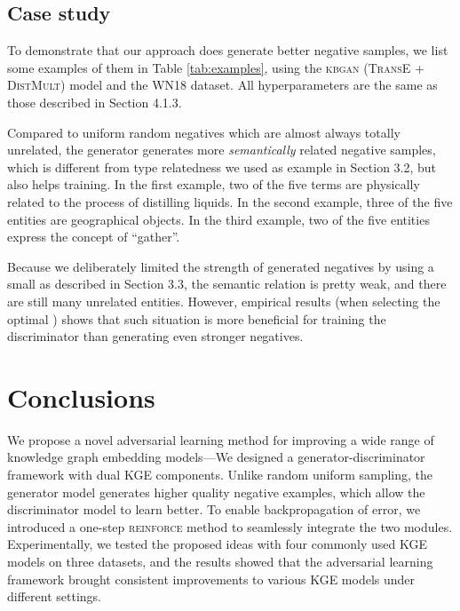 \documentclass[11pt,a4paper]{article}
\begin{document}
\subsection{Case study}

To demonstrate that our approach does generate better negative samples, we list some examples of them in Table \ref{tab:examples}, using the \textsc{kbgan} (\textsc{TransE} + \textsc{DistMult}) model and the WN18 dataset. All hyperparameters are the same as those described in Section 4.1.3.

Compared to uniform random negatives which are almost always totally unrelated, the generator generates more \emph{semantically} related negative samples, which is different from type relatedness we used as example in Section 3.2, but also helps training. In the first example, two of the five terms are physically related to the process of distilling liquids. In the second example, three of the five entities are geographical objects. In the third example, two of the five entities express the concept of ``gather''.

Because we deliberately limited the strength of generated negatives by using a small  as described in Section 3.3, the semantic relation is pretty weak, and there are still many unrelated entities. However, empirical results (when selecting the optimal ) shows that such situation is more beneficial for training the discriminator than generating even stronger negatives.

\section{Conclusions}
We propose a novel adversarial learning method for improving a wide range of knowledge graph embedding models---We designed a generator-discriminator framework with dual KGE components. Unlike random uniform sampling, the generator model generates higher quality negative examples, which allow the discriminator model to learn better. To enable backpropagation of error, we introduced a one-step \textsc{reinforce} method to seamlessly integrate the two modules. Experimentally, we tested the proposed ideas with four commonly used KGE models on three datasets, and the results showed that the adversarial learning framework brought consistent improvements to various KGE models under different settings.

\newpage


\end{document}
